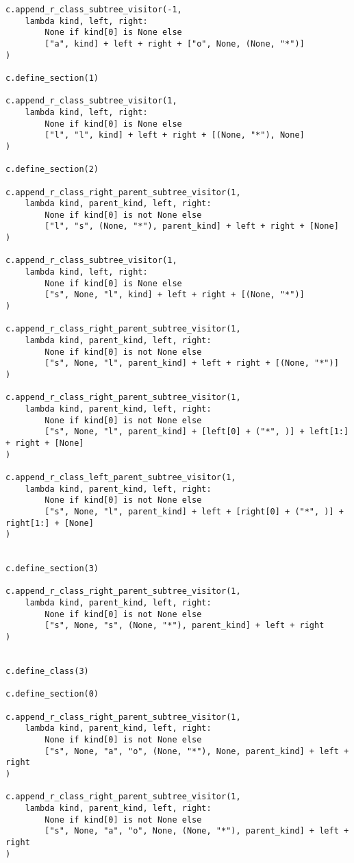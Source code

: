 \documentclass[final]{article}
\theoremstyle{definition}
\theoremstyle{definition}
\theoremstyle{remark}
\begin{document}
\begin{lstlisting}
c.append_r_class_subtree_visitor(-1,
    lambda kind, left, right:
        None if kind[0] is None else
        ["a", kind] + left + right + ["o", None, (None, "*")]
)

c.define_section(1)

c.append_r_class_subtree_visitor(1,
    lambda kind, left, right:
        None if kind[0] is None else
        ["l", "l", kind] + left + right + [(None, "*"), None]
)

c.define_section(2)

c.append_r_class_right_parent_subtree_visitor(1,
    lambda kind, parent_kind, left, right:
        None if kind[0] is not None else
        ["l", "s", (None, "*"), parent_kind] + left + right + [None]
)

c.append_r_class_subtree_visitor(1,
    lambda kind, left, right:
        None if kind[0] is None else
        ["s", None, "l", kind] + left + right + [(None, "*")]
)

c.append_r_class_right_parent_subtree_visitor(1,
    lambda kind, parent_kind, left, right:
        None if kind[0] is not None else
        ["s", None, "l", parent_kind] + left + right + [(None, "*")]
)

c.append_r_class_right_parent_subtree_visitor(1,
    lambda kind, parent_kind, left, right:
        None if kind[0] is not None else
        ["s", None, "l", parent_kind] + [left[0] + ("*", )] + left[1:] + right + [None]
)

c.append_r_class_left_parent_subtree_visitor(1,
    lambda kind, parent_kind, left, right:
        None if kind[0] is not None else
        ["s", None, "l", parent_kind] + left + [right[0] + ("*", )] + right[1:] + [None]
)


c.define_section(3)

c.append_r_class_right_parent_subtree_visitor(1,
    lambda kind, parent_kind, left, right:
        None if kind[0] is not None else
        ["s", None, "s", (None, "*"), parent_kind] + left + right
)


c.define_class(3)

c.define_section(0)

c.append_r_class_right_parent_subtree_visitor(1,
    lambda kind, parent_kind, left, right:
        None if kind[0] is not None else
        ["s", None, "a", "o", (None, "*"), None, parent_kind] + left + right
)

c.append_r_class_right_parent_subtree_visitor(1,
    lambda kind, parent_kind, left, right:
        None if kind[0] is not None else
        ["s", None, "a", "o", None, (None, "*"), parent_kind] + left + right
)


\end{lstlisting}
\end{document}
